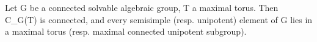 Let G be a connected solvable algebraic group, T a maximal torus. Then C_G(T) is connected, and every semisimple (resp. unipotent) element of G lies in a maximal torus (resp. maximal connected unipotent subgroup).
